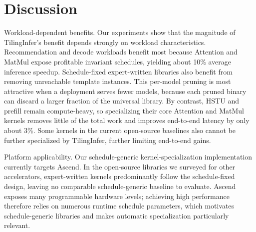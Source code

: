 \section{Discussion}
\label{sec:discussion}

{\color{red}%
\par}

{\color{blue}%
Workload-dependent benefits. Our experiments show that the magnitude of TilingInfer's benefit depends strongly on workload characteristics. Recommendation and decode workloads benefit most because Attention and MatMul expose profitable invariant schedules, yielding about 10\% average inference speedup. Schedule-fixed expert-written libraries also benefit from removing unreachable template instances. This per-model pruning is most attractive when a deployment serves fewer models, because each pruned binary can discard a larger fraction of the universal library. By contrast, HSTU and prefill remain compute-heavy, so specializing their core Attention and MatMul kernels removes little of the total work and improves end-to-end latency by only about 3\%. Some kernels in the current open-source baselines also cannot be further specialized by TilingInfer, further limiting end-to-end gains.
\par}

{\color{red}%
\par}

{\color{blue}%
Platform applicability. Our schedule-generic kernel-specialization implementation currently targets Ascend. In the open-source libraries we surveyed for other accelerators, expert-written kernels predominantly follow the schedule-fixed design, leaving no comparable schedule-generic baseline to evaluate. Ascend exposes many programmable hardware levels; achieving high performance therefore relies on numerous runtime schedule parameters, which motivates schedule-generic libraries and makes automatic specialization particularly relevant.
\par}

